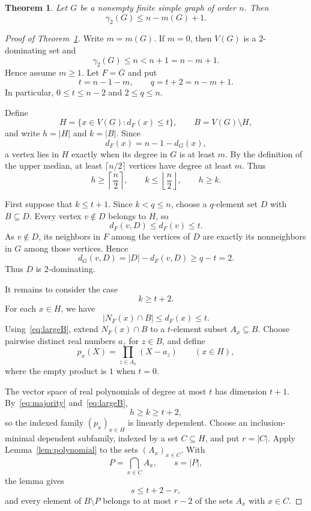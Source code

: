 \documentclass[10pt,a4paper]{amsart}
\newtheorem{theorem}{Theorem}
\newcommand{\gammatwo}{\gamma_{2}}
\begin{document}
\begin{theorem}\label{thm:main}
Let $G$ be a nonempty finite simple graph of order $n$.  Then
\[
  \gammatwo(G)\leq n-m(G)+1.
\]
\end{theorem}

\begin{proof}[Proof of Theorem~\ref{thm:main}]
Write $m=m(G)$.  If $m=0$, then $V(G)$ is a 2-dominating set and
\[
  \gammatwo(G)\leq n<n+1=n-m+1.
\]
Hence assume $m\geq 1$.  Let $F=\overline G$ and put
\[
  t=n-1-m,
  \qquad q=t+2=n-m+1.
\]
In particular, $0\leq t\leq n-2$ and $2\leq q\leq n$.

Define
\[
  H=\{x\in V(G):d_F(x)\leq t\},
  \qquad B=V(G)\setminus H,
\]
and write $h=|H|$ and $k=|B|$.  Since
\[
  d_F(x)=n-1-d_G(x),
\]
a vertex lies in $H$ exactly when its degree in $G$ is at least $m$.  By the
definition of the upper median, at least $\lceil n/2\rceil$ vertices have
degree at least $m$.  Thus
\begin{equation}\label{eq:majority}
  h\geq\left\lceil\frac n2\right\rceil,
  \qquad
  k\leq\left\lfloor\frac n2\right\rfloor,
  \qquad h\geq k.
\end{equation}

First suppose that $k\leq t+1$.  Since $k<q\leq n$, choose a $q$-element set
$D$ with $B\subseteq D$.  Every vertex $v\notin D$ belongs to $H$, so
\[
  d_F(v,D)\leq d_F(v)\leq t.
\]
As $v\notin D$, its neighbors in $F$ among the vertices of $D$ are exactly
its nonneighbors in $G$ among those vertices.  Hence
\[
  d_G(v,D)=|D|-d_F(v,D)\geq q-t=2.
\]
Thus $D$ is 2-dominating.

It remains to consider the case
\begin{equation}\label{eq:largeB}
  k\geq t+2.
\end{equation}
For each $x\in H$, we have
\[
  |N_F(x)\cap B|\leq d_F(x)\leq t.
\]
Using~\eqref{eq:largeB}, extend $N_F(x)\cap B$ to a $t$-element subset
$A_x\subseteq B$.  Choose pairwise distinct real numbers $a_z$ for $z\in B$,
and define
\[
  p_x(X)=\prod_{z\in A_x}(X-a_z) \qquad (x\in H),
\]
where the empty product is $1$ when $t=0$.

The vector space of real polynomials of degree at most $t$ has dimension
$t+1$.  By~\eqref{eq:majority} and~\eqref{eq:largeB},
\[
  h\geq k\geq t+2,
\]
so the indexed family $(p_x)_{x\in H}$ is linearly dependent.  Choose an
inclusion-minimal dependent subfamily, indexed by a set $C\subseteq H$, and
put $r=|C|$.  Apply Lemma~\ref{lem:polynomial} to the sets $(A_x)_{x\in C}$.
With
\[
  P=\bigcap_{x\in C}A_x,
  \qquad s=|P|,
\]
the lemma gives
\begin{equation}\label{eq:intersection}
  s\leq t+2-r,
\end{equation}
and every element of $B\setminus P$ belongs to at most $r-2$ of the sets
$A_x$ with $x\in C$.


\end{proof}
\end{document}
